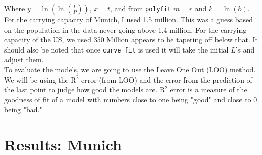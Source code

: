 \documentclass[english]{article}
\begin{document}
Where $ y=\ln\left(\ln\left(\frac{L}{P}\right)\right) $, $ x=t $, and from \verb|polyfit| $ m=r $ and $ k=\ln(b) $.\\

For the carrying capacity of Munich, I used 1.5 million. This was a guess based on the population in the data \cite{wiki} never going above 1.4 million. For the carrying capacity of the US, we used 350 Million appears to be tapering off below that. It should also be noted that once \verb|curve_fit| is used it will take the initial $ L $'s and adjust them.\\

To evaluate the models, we are going to use the Leave One Out (LOO) method. We will be using the $ \text{R}^2 $ error (from LOO) and the error from the prediction of the last point to judge how good the models are. $ \text{R}^2 $ error is a measure of the goodness of fit of a model with numbers close to one being "good" and close to 0 being "bad."
\section{Results: Munich}
\end{document}

